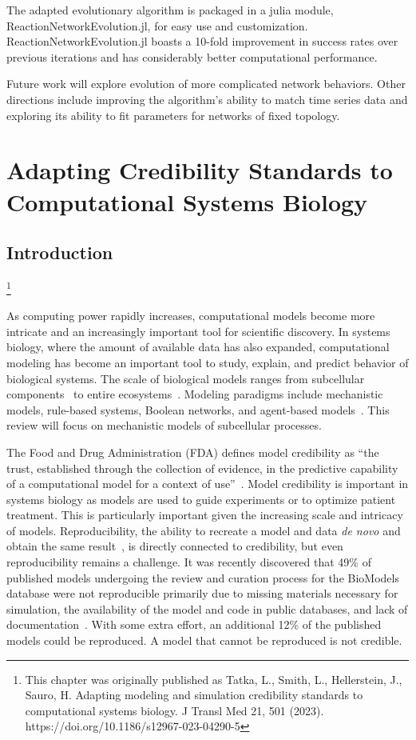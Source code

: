 \documentclass[12pt]{report}
\newcommand\blfootnote[1]{%
  \begingroup
  \renewcommand\thefootnote{}\footnote{#1}%
  \addtocounter{footnote}{-1}%
  \endgroup
}
\begin{document}
The adapted evolutionary algorithm is packaged in a julia module, ReactionNetworkEvolution.jl, for easy use and customization. ReactionNetworkEvolution.jl boasts a 10-fold improvement in success rates over previous iterations and has considerably better computational performance.

Future work will explore evolution of more complicated network behaviors. Other directions include improving the algorithm's ability to match time series data and exploring its ability to fit parameters for networks of fixed topology.

\chapter{Adapting Credibility Standards to Computational Systems Biology}
\label{chap: review_paper}

\section{Introduction}

\blfootnote{This chapter was originally published as Tatka, L., Smith, L., Hellerstein, J., Sauro, H. Adapting modeling and simulation credibility standards to computational systems biology. J Transl Med 21, 501 (2023).
\\https://doi.org/10.1186/s12967-023-04290-5}As computing power rapidly increases, computational models become more intricate and an increasingly important tool for scientific discovery. In systems biology, where the amount of available data has also expanded, computational modeling has become an important tool to study, explain, and predict behavior of biological systems. The scale of biological models ranges from subcellular components~\cite{Wang2021} to entire ecosystems~\cite{Hassell2021}. Modeling paradigms include mechanistic models, rule-based systems, Boolean networks, and agent-based models~\cite{Bartocci2016}. This review will focus on mechanistic models of subcellular processes.

The Food and Drug Administration (FDA) defines model credibility as ``the trust, established through the collection of evidence, in the predictive capability of a computational model for a context of use''~\cite{FDAguidelines}. Model credibility is important in systems biology as models are used to guide experiments or to optimize patient treatment. This is particularly important given the increasing scale and intricacy of models. Reproducibility, the ability to recreate a model and data \textit{de novo} and obtain the same result~\cite{shin_standards_nodate}, is directly connected to credibility, but even reproducibility remains a challenge. It was recently discovered that 49\% of published models undergoing the review and curation process for the BioModels~\cite{BioModels2020} database were not reproducible primarily due to missing materials necessary for simulation, the availability of the model and code in public databases, and lack of documentation~\cite{tiwari_reproducibility_2021}. With some extra effort, an additional 12\% of the published models could be reproduced.  A model that cannot be reproduced is not credible. 
\end{document}
